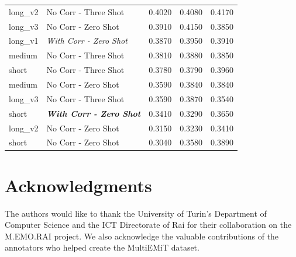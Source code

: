 \documentclass[letterpaper,journal]{IEEEtran}
\begin{document}
\begin{table}[!t]
\begin{tabular}{l|l|c|c|c}
long\_v2          & No Corr - Three Shot                     & 0.4020            & 0.4080             & 0.4170          \\
long\_v3          & No Corr - Zero Shot                      & 0.3910            & 0.4150             & 0.3850          \\
long\_v1          & \textit{With Corr - Zero Shot}           & 0.3870            & 0.3950             & 0.3910          \\
medium            & No Corr - Three Shot                     & 0.3810            & 0.3880             & 0.3850          \\
short             & No Corr - Three Shot                     & 0.3780            & 0.3790             & 0.3960          \\
medium            & No Corr - Zero Shot                      & 0.3590            & 0.3840             & 0.3840          \\
long\_v3          & No Corr - Three Shot                     & 0.3590            & 0.3870             & 0.3540          \\
short             & \textit{\textbf{With Corr - Zero Shot}}  & 0.3410            & 0.3290             & 0.3650          \\
long\_v2          & No Corr - Zero Shot                      & 0.3150            & 0.3230             & 0.3410          \\
short             & No Corr - Zero Shot                      & 0.3040            & 0.3580             & 0.3890         
\end{tabular}
\end{table}

\section*{Acknowledgments}
The authors would like to thank the University of Turin's Department of Computer Science and the ICT Directorate of Rai for their collaboration on the M.EMO.RAI project. We also acknowledge the valuable contributions of the annotators who helped create the MultiEMiT dataset.

\end{document}
